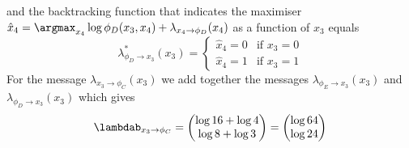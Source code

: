 \begin{exenumerate}
\begin{solution}
\begin{equation}
      \end{equation}
      and the backtracking function that indicates the maximiser
      $\hat{x}_4 = \argmax_{x_4} \log \phi_D(x_3, x_4) +  \lambda_{x_4 \to \phi_D}(x_4)$ as a function of $x_3$ equals
      \begin{equation}
        \lambda^*_{\phi_D \to x_3}(x_3) = \begin{cases}
          \hat{x}_4=0 & \text{if } x_3= 0\\
          \hat{x}_4=1 & \text{if } x_3= 1
          \end{cases}
      \end{equation}
      For the message $\lambda_{x_3 \to \phi_C}(x_3)$ we add together
      the messages $\lambda_{\phi_E \to x_3}(x_3)$ and
      $\lambda_{\phi_D \to x_3}(x_3)$ which gives
      \begin{equation}
        \lambdab_{ x_3 \to \phi_C} = \begin{pmatrix}
          \log 16 + \log 4\\
          \log 8 + \log 3\\
        \end{pmatrix}
        =\begin{pmatrix}
        \log 64\\
        \log 24\\
        \end{pmatrix}
      \end{equation}
      

\end{solution}
\end{exenumerate}
